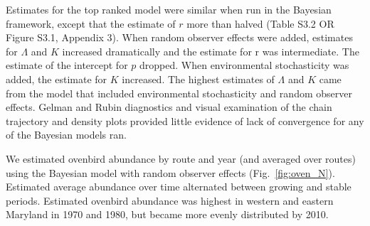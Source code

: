 \documentclass[12pt,english]{article}
\begin{document}
\begin{spacing}{1.9}
\begin{flushleft}
Estimates for the top ranked model %
were similar when
run in the Bayesian framework, except that the estimate of $r$
more than halved 
(Table S3.2 OR Figure S3.1, Appendix 3). %
When random observer effects
were added, estimates for $\Lambda$ and $K$ increased dramatically
and the estimate for r was intermediate. The %
estimate of the intercept for $p$ dropped. %
When environmental stochasticity was added, the estimate for $K$ increased. %
The highest estimates of $\Lambda$ and $K$ came 
from the model that included environmental stochasticity and random observer effects. %
Gelman and Rubin diagnostics and visual examination of the chain trajectory and density plots
provided little evidence of lack of convergence for any of the Bayesian models ran.  

We estimated ovenbird abundance by route and year (and averaged over routes) 
using the Bayesian model with random observer effects (Fig.~\ref{fig:oven_N}).  
Estimated average abundance over time alternated between growing and stable periods.  
Estimated ovenbird
abundance was highest in western and eastern Maryland in 1970 and 1980, but became
more evenly distributed by 2010.  


\end{flushleft}
\end{spacing}
\end{document}
